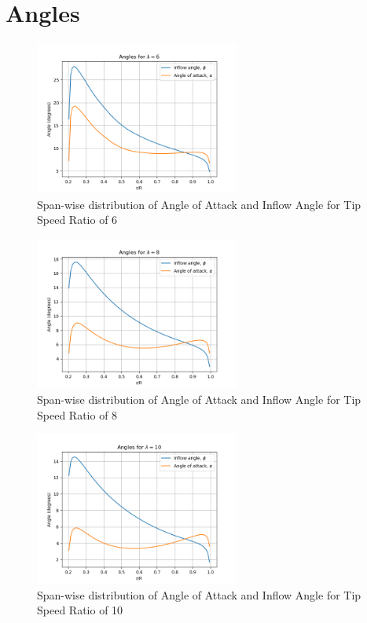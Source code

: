 \section{Angles}
\begin{figure}[H]
    \centering
    \includegraphics[width=0.6\textwidth]{Figures/alpha_phi_6.png}
    \caption{Span-wise distribution of Angle of Attack and Inflow Angle for Tip Speed Ratio of 6}
    \label{fig:span-wise distribution of angle of attack and inflow angle - lambda 6}
\end{figure}
\begin{figure}[H]
    \centering
    \includegraphics[width=0.6\textwidth]{Figures/alfa_phi_8.png}
    \caption{Span-wise distribution of Angle of Attack and Inflow Angle for Tip Speed Ratio of 8}
    \label{fig:span-wise distribution of angle of attack and inflow angle - lambda 8}
\end{figure}
\begin{figure}[H]
    \centering
    \includegraphics[width=0.6\textwidth]{Figures/alfa_phi_10.png}
    \caption{Span-wise distribution of Angle of Attack and Inflow Angle for Tip Speed Ratio of 10}
    \label{fig:span-wise distribution of angle of attack and inflow angle - lambda 10}
\end{figure}

